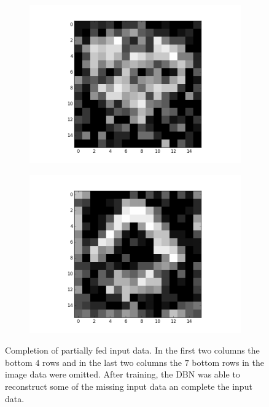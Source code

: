 \begin{figure}[h!]
\begin{subfigure}{.25\textwidth}
  		\includegraphics[width=\linewidth]{imgs/poker/compl32.png}
  		\label{fig:sub1}
	\end{subfigure}%
	\begin{subfigure}{.25\textwidth}
  		\centering
  		\includegraphics[width=\linewidth]{imgs/poker/compl42.png}
  		\label{fig:sub1}
	\end{subfigure}%
	\caption{Completion of partially fed input data. In the first two columns the bottom $4$ rows and in the last two columns the $7$ bottom rows in the image data were omitted. After training, the DBN was able to reconstruct some of the missing input data an complete the input data.}
	\label{fig:pokercompl}
\end{figure}


